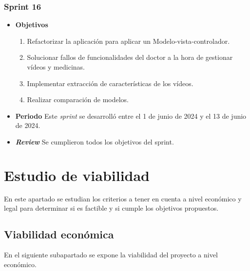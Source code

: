 \subsubsection{Sprint 16}
\begin{itemize}
\item \textbf{Objetivos}
\begin{enumerate}
\item Refactorizar la aplicación para aplicar un Modelo-vista-controlador.
\item Solucionar fallos de funcionalidades del doctor a la hora de gestionar vídeos y medicinas.
\item Implementar extracción de características de los vídeos.
\item Realizar comparación de modelos.
\end{enumerate}
\item \textbf{Periodo}
Este \textsl{sprint} se desarrolló entre el 1 de junio de 2024 y el 13 de junio de 2024.
\item \textbf{\textsl{Review}}
Se cumplieron todos los objetivos del sprint.
\end{itemize}
\section{Estudio de viabilidad}
En este apartado se estudian los criterios a tener en cuenta a nivel económico y legal para determinar si es factible y si cumple los objetivos propuestos.

\subsection{Viabilidad económica}
En el siguiente subapartado se expone la viabilidad del proyecto a nivel económico.

